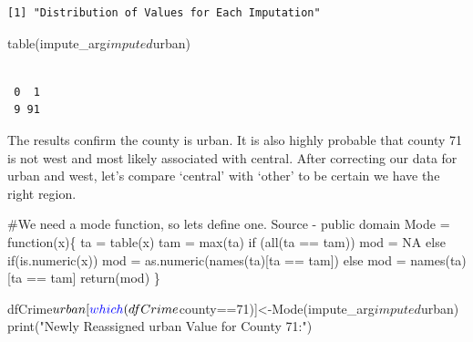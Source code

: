 \documentclass[]{article}
\newenvironment{Shaded}{}{}
\newcommand{\CommentTok}[1]{\textcolor[rgb]{0.00,0.50,0.00}{#1}}
\newcommand{\ControlFlowTok}[1]{\textcolor[rgb]{0.00,0.00,1.00}{#1}}
\newcommand{\DecValTok}[1]{#1}
\newcommand{\KeywordTok}[1]{\textcolor[rgb]{0.00,0.00,1.00}{#1}}
\newcommand{\NormalTok}[1]{#1}
\newcommand{\OperatorTok}[1]{#1}
\newcommand{\OtherTok}[1]{\textcolor[rgb]{1.00,0.25,0.00}{#1}}
\newcommand{\StringTok}[1]{\textcolor[rgb]{0.00,0.50,0.50}{#1}}
\begin{document}
\begin{verbatim}
[1] "Distribution of Values for Each Imputation"
\end{verbatim}

\begin{Shaded}
\begin{Highlighting}[]
\KeywordTok{table}\NormalTok{(impute_arg}\OperatorTok{$}\NormalTok{imputed}\OperatorTok{$}\NormalTok{urban)}
\end{Highlighting}
\end{Shaded}

\begin{verbatim}

 0  1 
 9 91 
\end{verbatim}

The results confirm the county is urban. It is also highly probable that
county 71 is not west and most likely associated with central. After
correcting our data for urban and west, let's compare `central' with
`other' to be certain we have the right region.

\begin{Shaded}
\begin{Highlighting}[]
\CommentTok{#We need a mode function, so lets define one. Source - public domain}
\NormalTok{Mode =}\StringTok{ }\ControlFlowTok{function}\NormalTok{(x)\{ }
\NormalTok{    ta =}\StringTok{ }\KeywordTok{table}\NormalTok{(x)}
\NormalTok{    tam =}\StringTok{ }\KeywordTok{max}\NormalTok{(ta)}
    \ControlFlowTok{if}\NormalTok{ (}\KeywordTok{all}\NormalTok{(ta }\OperatorTok{==}\StringTok{ }\NormalTok{tam))}
\NormalTok{         mod =}\StringTok{ }\OtherTok{NA}
    \ControlFlowTok{else}
         \ControlFlowTok{if}\NormalTok{(}\KeywordTok{is.numeric}\NormalTok{(x))}
\NormalTok{    mod =}\StringTok{ }\KeywordTok{as.numeric}\NormalTok{(}\KeywordTok{names}\NormalTok{(ta)[ta }\OperatorTok{==}\StringTok{ }\NormalTok{tam])}
    \ControlFlowTok{else}
\NormalTok{         mod =}\StringTok{ }\KeywordTok{names}\NormalTok{(ta)[ta }\OperatorTok{==}\StringTok{ }\NormalTok{tam]}
    \KeywordTok{return}\NormalTok{(mod)}
\NormalTok{\}}

\NormalTok{dfCrime}\OperatorTok{$}\NormalTok{urban[}\KeywordTok{which}\NormalTok{(dfCrime}\OperatorTok{$}\NormalTok{county}\OperatorTok{==}\DecValTok{71}\NormalTok{)]<-}\KeywordTok{Mode}\NormalTok{(impute_arg}\OperatorTok{$}\NormalTok{imputed}\OperatorTok{$}\NormalTok{urban)}
\KeywordTok{print}\NormalTok{(}\StringTok{"Newly Reassigned urban Value for County 71:"}\NormalTok{)}
\end{Highlighting}
\end{Shaded}
\end{document}
